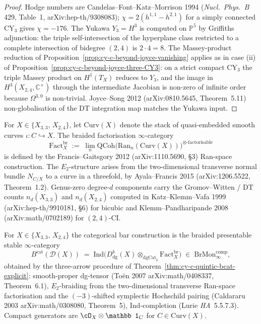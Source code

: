 \begin{proof}
Hodge numbers are Candelas--Font--Katz--Morrison 1994
(\emph{Nucl.\ Phys.\ B} 429, Table~1, arXiv:hep-th/9308083);
$\chi = 2(h^{1,1} - h^{2,1})$ for a simply connected CY$_3$ gives
$\chi = -176$. The Yukawa $Y_3 = H^3$ is computed on $\mathbb P^5$ by
Griffiths adjunction: the triple self-intersection of the hyperplane
class restricted to a complete intersection of bidegree $(2,4)$ is
$2 \cdot 4 = 8$. The Massey-product reduction of
Proposition~\ref{prop:cy-c-beyond-joyce-vanishing} applies as in case
(ii) of Proposition~\ref{prop:cy-c-beyond-joyce-three-CY3}: on a
strict compact CY$_3$ the triple Massey product on $H^1(T_X)$ reduces
to $Y_3$, and the image in $H^3(X_{2,4}, \mathbb C^\times)$ through
the intermediate Jacobian is non-zero of infinite order because
$\Omega^{3,0}$ is non-trivial. Joyce--Song 2012
(arXiv:0810.5645, Theorem~5.11) non-globalisation of the DT
integration map matches the Yukawa input.
\end{proof}

\begin{definition}
\label{def:cy-c-bicubic-24CI-fact-cat}
For $X \in \{X_{3,3},\, X_{2,4}\}$, let $\mathrm{Curv}(X)$ denote the
stack of quasi-embedded smooth curves $\iota : C \hookrightarrow X$.
The braided factorisation $\infty$-category
\[
 \mathrm{Fact}^{\mathrm{br}}_X
 \;:=\;
 \lim_n \mathrm{QCoh}\bigl(\mathrm{Ran}_n(\mathrm{Curv}(X))\bigr)^{\otimes\text{-factorisable}}
\]
is defined by the Francis--Gaitsgory 2012 (arXiv:1110.5690, \S 3)
Ran-space construction. The $E_2$-structure arises from the
two-dimensional transverse normal bundle $N_{C/X}$ to a curve in a
threefold, by Ayala--Francis 2015 (arXiv:1206.5522, Theorem~1.2).
Genus-zero degree-$d$ components carry the Gromov--Witten / DT counts
$n_d(X_{3,3})$ and $n_d(X_{2,4})$ computed in Katz--Klemm--Vafa 1999
(arXiv:hep-th/9910181, \S 6) for bicubic and Klemm--Pandharipande
2008 (arXiv:math/0702189) for $(2,4)$-CI.
\end{definition}

\begin{theorem}
\label{thm:cy-c-bicubic-24CI-bcat-explicit}
For $X \in \{X_{3,3},\, X_{2,4}\}$ the categorical bar construction is
the braided presentable stable $\infty$-category
\[
 B^{\mathrm{cat}}(\mathcal D(X))
 \;=\;
 \mathrm{Ind}\!\bigl(
 D^b_{\mathrm{dg}}(X) \otimes_{\mathrm{dgCat}_k}
 \mathrm{Fact}^{\mathrm{br}}_X
 \bigr)
 \;\in\; \mathrm{BrMon}^{\mathrm{comp}}_\infty,
\]
obtained by the three-arrow procedure of
Theorem~\ref{thm:cy-c-quintic-bcat-explicit}: smooth-proper dg-tensor
(To\"en 2007 arXiv:math/0408337, Theorem~6.1), $E_2$-braiding from
the two-dimensional transverse Ran-space factorisation and the
$(-3)$-shifted symplectic Hochschild pairing (Caldararu 2003
arXiv:math/0308080, Theorem~5), $\mathrm{Ind}$-completion (Lurie
\emph{HA}~5.5.7.3). Compact generators are
$\cO_X \otimes \mathbb 1_C$ for $C \in \mathrm{Curv}(X)$.
\end{theorem}

